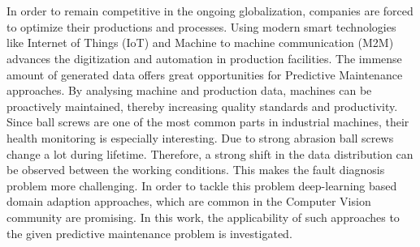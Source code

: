 \chapter{\abstractname}

In order to remain competitive in the ongoing globalization, companies are forced to optimize their productions and processes. Using modern smart technologies like Internet of Things (IoT) and Machine to machine communication (M2M) advances the digitization and automation in production facilities. The immense amount of generated data offers great opportunities for Predictive Maintenance approaches. By analysing machine and production data, machines can be proactively maintained, thereby increasing quality standards and productivity. Since ball screws are one of the most common parts in industrial machines, their health monitoring is especially interesting. Due to strong abrasion ball screws change a lot during lifetime.
Therefore, a strong shift in the data distribution can be observed between the working conditions. This makes the fault diagnosis problem more challenging. In order to tackle this problem deep-learning based domain adaption approaches, which are common in the Computer Vision community are promising. In this work, the applicability of such approaches to the given predictive maintenance problem is investigated. 




\makeatletter
{}
{\renewcommand{\abstractname}{Kurzfassung}}
{\renewcommand{\abstractname}{Abstract}}
\makeatother

\chapter{\abstractname}

